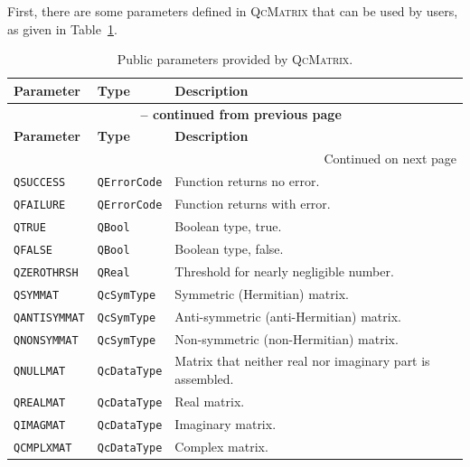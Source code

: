\documentclass[a4paper,11pt,twoside,openright]{book}
\begin{document}
First, there are some parameters defined in \textsc{QcMatrix} that can be used by users,
as given in Table~\ref{tab-QcMatrix-parameters}.
\begin{center}
  \small
  \begin{longtable}{l|l|p{}}
    \caption{Public parameters provided by \textsc{QcMatrix}.}
    \label{tab-QcMatrix-parameters}\\
    \hline\hline
    \textbf{Parameter} & \textbf{Type} & \textbf{Description}\\
    \hline
    \endfirsthead
    \multicolumn{3}{c}{{\bfseries \tablename\ \thetable{} -- continued from previous page}}\\
    \hline\hline
    \textbf{Parameter} & \textbf{Type} & \textbf{Description}\\
    \hline
    \endhead
    \hline
    \multicolumn{3}{r}{Continued on next page}\\
    \hline
    \endfoot
    \hline\hline
    \endlastfoot
%
    \verb|QSUCCESS| & \verb|QErrorCode| & Function returns no error.\\
    \verb|QFAILURE| & \verb|QErrorCode| & Function returns with error.\\
    \verb|QTRUE| & \verb|QBool| & Boolean type, true.\\
    \verb|QFALSE| & \verb|QBool| & Boolean type, false.\\
    \verb|QZEROTHRSH| & \verb|QReal| & Threshold for nearly negligible number.\\
    \verb|QSYMMAT| & \verb|QcSymType| & Symmetric (Hermitian) matrix.\\
    \verb|QANTISYMMAT| & \verb|QcSymType| & Anti-symmetric (anti-Hermitian) matrix.\\
    \verb|QNONSYMMAT| & \verb|QcSymType| & Non-symmetric (non-Hermitian) matrix.\\
    \verb|QNULLMAT| & \verb|QcDataType| & Matrix that neither real nor imaginary part is assembled.\\
    \verb|QREALMAT| & \verb|QcDataType| & Real matrix.\\
    \verb|QIMAGMAT| & \verb|QcDataType| & Imaginary matrix.\\
    \verb|QCMPLXMAT| & \verb|QcDataType| & Complex matrix.\\

\end{longtable}
\end{center}
\end{document}
